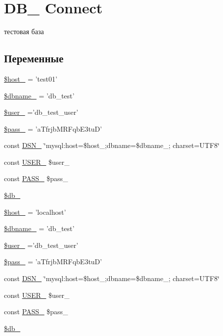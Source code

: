 \hypertarget{group___d_b__2}{\section{D\-B\-\_ Connect}
\label{group___d_b__2}
}


тестовая база  


\subsection*{Переменные}
\begin{DoxyCompactItemize}
\item 
\hyperlink{group___d_b__2_ga1fca5ca6a998917bdf494cfd985b6025}{\$host\-\_} = 'test01'
\item 
\hyperlink{group___d_b__2_gae40cd9ac0cdd9542398e94e75a970c0c}{\$dbname\-\_} = 'db\-\_\-test'
\item 
\hyperlink{group___d_b__2_gaf33b43cdfbb1e0ca41bfd37425fc6bfe}{\$user\-\_} ='db\-\_\-test\-\_\-user'
\item 
\hyperlink{group___d_b__2_gab3a158e940b491fbf53fd8271fb05e45}{\$pass\-\_} = 'a\-Tfrjb\-M\-R\-Fqb\-E3tu\-D'
\item 
const \hyperlink{group___d_b__2_ga72e6fba3d74199ad6e7e817a61e4a14d}{D\-S\-N\-\_} \char`\"{}mysql\-:host=\$host\-\_;dbname=\$dbname\-\_; charset=U\-T\-F8\char`\"{}
\item 
const \hyperlink{group___d_b__2_ga92b63a34ae60895214a8f31ebb5e9b58}{U\-S\-E\-R\-\_} \$user\-\_
\item 
const \hyperlink{group___d_b__2_ga8b3fe80baea61cdf88958113cc16a363}{P\-A\-S\-S\-\_} \$pass\-\_
\item 
\hyperlink{group___d_b__2_ga35a69e2032e40a7d510004071c24c17c}{\$db\-\_}
\item 
\hyperlink{group___d_b__2_ga1fca5ca6a998917bdf494cfd985b6025}{\$host\-\_} = 'localhost'
\item 
\hyperlink{group___d_b__2_gae40cd9ac0cdd9542398e94e75a970c0c}{\$dbname\-\_} = 'db\-\_\-test'
\item 
\hyperlink{group___d_b__2_gaf33b43cdfbb1e0ca41bfd37425fc6bfe}{\$user\-\_} ='db\-\_\-test\-\_\-user'
\item 
\hyperlink{group___d_b__2_gab3a158e940b491fbf53fd8271fb05e45}{\$pass\-\_} = 'a\-Tfrjb\-M\-R\-Fqb\-E3tu\-D'
\item 
const \hyperlink{group___d_b__2_ga72e6fba3d74199ad6e7e817a61e4a14d}{D\-S\-N\-\_} \char`\"{}mysql\-:host=\$host\-\_;dbname=\$dbname\-\_; charset=U\-T\-F8\char`\"{}
\item 
const \hyperlink{group___d_b__2_ga92b63a34ae60895214a8f31ebb5e9b58}{U\-S\-E\-R\-\_} \$user\-\_
\item 
const \hyperlink{group___d_b__2_ga8b3fe80baea61cdf88958113cc16a363}{P\-A\-S\-S\-\_} \$pass\-\_
\item 
\hyperlink{group___d_b__2_ga35a69e2032e40a7d510004071c24c17c}{\$db\-\_}
\end{DoxyCompactItemize}


